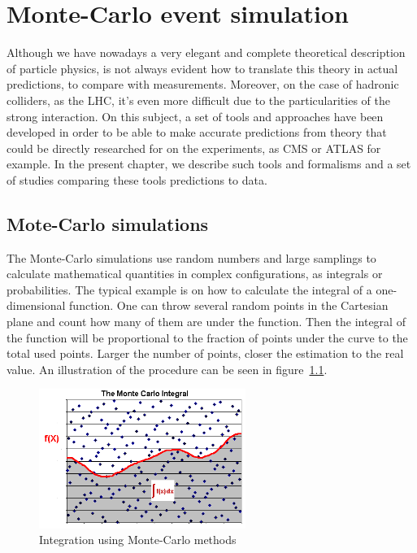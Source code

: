 \chapter[MC event generation]{Monte-Carlo event simulation}
\label{chap:MC}

Although we have nowadays a very elegant and complete theoretical description of particle physics, is not always evident how to translate this theory in actual predictions, to compare with measurements. Moreover, on the case of hadronic colliders, as the LHC, it's even more difficult due to the particularities of the strong interaction. On this subject, a set of tools and approaches have been developed in order to be able to make accurate predictions from theory that could be directly researched for on the experiments, as CMS or ATLAS for example. In the present chapter, we describe such tools and formalisms and a set of studies comparing these tools predictions to data. 

\section{Mote-Carlo simulations}
\label{sec:MC}

The Monte-Carlo simulations use random numbers and large samplings to calculate mathematical quantities in complex configurations, as integrals or probabilities. The typical example is on how to calculate the integral of a one-dimensional function. One can throw several random points in the Cartesian plane and count how many of them are under the function. Then the integral of the function will be proportional to the fraction of points under the curve to the total used points. Larger the number of points, closer the estimation to the real value. An illustration of the procedure can be seen in figure~\ref{fig:mc_int}.

\begin{figure}[!Hhtbp]
  \begin{center}
    \includegraphics[width=0.6\textwidth]{figs/mc_integral.png}
    \caption{Integration using Monte-Carlo methods}
    \label{fig:mc_int}
  \end{center}
\end{figure}

